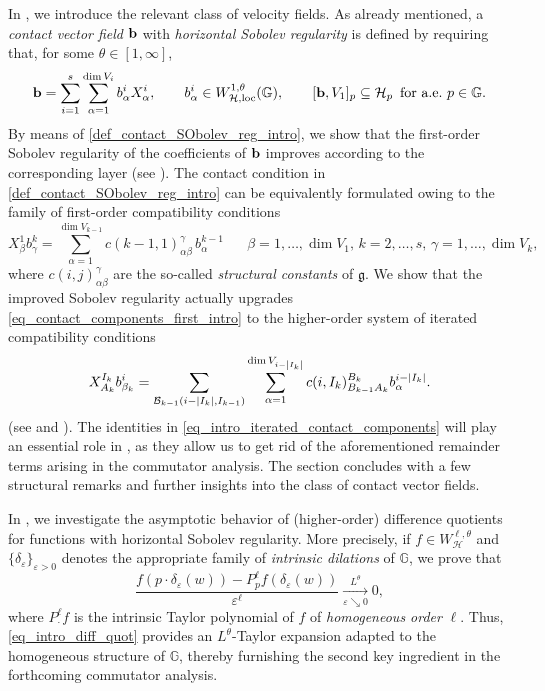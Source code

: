 \documentclass[11pt]{amsart}
\newcommand{\hhh}{{\mathcal{H}}}
\newcommand{\bb}{{\bf {b}}} %
\newcommand{\eps}{\varepsilon}
\DeclarePairedDelimiter{\abs}{\lvert}{\rvert}
\theoremstyle{plain}
\theoremstyle{definition}
\theoremstyle{remark}
\numberwithin{equation}{section}
\begin{document}
\medskip
In , we introduce the relevant class of velocity fields. As already mentioned, a \emph{contact vector field} $\bb$ with \emph{horizontal Sobolev regularity} is defined by requiring that, for some $\theta\in[1,\infty]$,
\begin{equation}\label{def_contact_SObolev_reg_intro}
    \bb=\sum_{i=1}^s\sum_{\alpha=1}^{\dim V_i}b^i_\alpha X^i_\alpha,\qquad b^i_\alpha\in W^{1,\theta}_{\hhh,\mathrm{loc}}(\mathbb G),\qquad [\bb,V_1]_p\subseteq\hhh_p\,\text{ for a.e.~$p\in\mathbb G$.}
\end{equation}
By means of \eqref{def_contact_SObolev_reg_intro}, we show that the first-order Sobolev regularity of the coefficients of $\bb$ improves according to the corresponding layer (see ). The contact condition in \eqref{def_contact_SObolev_reg_intro} can be equivalently formulated owing to the family of first-order compatibility conditions
\begin{equation} \label{eq_contact_components_first_intro}
X^1_\beta b^k_\gamma = \sum_{\alpha=1}^{\dim V_{k-1}} c(k-1,1)^\gamma_{\alpha \beta} \, b^{k-1}_\alpha\quad \text{ $\beta=1,\dots,\dim V_1$, $k=2,\dots,s$, $\gamma=1,\dots,\dim V_k$},
\end{equation}
where $c(i,j)^\gamma_{\alpha \beta}$ are the so-called \emph{structural constants} of $\mathfrak g$. We show that the improved Sobolev regularity actually upgrades \eqref{eq_contact_components_first_intro} to the higher-order system of iterated compatibility conditions
\begin{equation} \label{eq_intro_iterated_contact_components}
X^{I_k}_{A_k} b^i_{\beta_k} = \sum_{\mathcal B_{k-1}(i-\abs*{I_k},I_{k-1})} \sum_{\alpha=1}^{\dim V_{i-\abs*{I_k}}} c(i,I_k)_{B_{k-1} A_k}^{B_k} b^{i-\abs*{I_k}}_\alpha.
\end{equation}
(see  and  ). The identities in \eqref{eq_intro_iterated_contact_components} will play an essential role in , as they allow us to get rid of the aforementioned remainder terms arising in the commutator analysis.
 The section concludes with a few structural remarks and further insights into the class of contact vector fields.

 \medskip
In , we investigate the asymptotic behavior of (higher-order) difference quotients for functions with horizontal Sobolev regularity. More precisely, if $f\in W^{\ell,\theta}_\hhh$ and $\{\delta_\eps\}_{\eps>0}$ denotes the appropriate family of \emph{intrinsic dilations} of $\mathbb G$, we prove that
\begin{equation}\label{eq_intro_diff_quot}
\frac{f\left(p\cdot\delta_\eps(w)\right)-P^\ell_p f\left(\delta_\eps(w)\right)}{\eps^\ell}
\xrightarrow[\eps\searrow0]{L^\theta}0,
\end{equation}
where $P^\ell_\cdot f$ is the intrinsic Taylor polynomial of $f$ of \emph{homogeneous order} $\ell$. Thus, \eqref{eq_intro_diff_quot} provides an $L^\theta$-Taylor expansion adapted to the homogeneous structure of $\mathbb G$, thereby furnishing the second key ingredient in the forthcoming commutator analysis.
\end{document}
